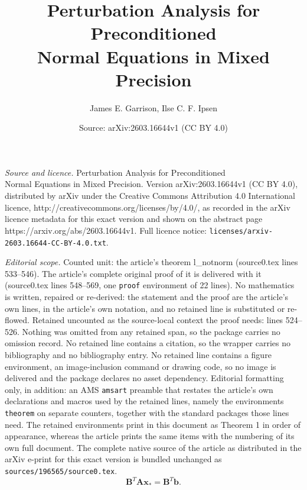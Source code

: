 \documentclass[10pt,a4paper]{amsart}
\title{Perturbation Analysis for Preconditioned\\ Normal Equations in Mixed Precision}
\author{James E. Garrison, Ilse C. F. Ipsen}
\date{Source: arXiv:2603.16644v1 (CC BY 4.0)}
\newcommand{\ma}{\boldsymbol{A}}
\newcommand{\mb}{\boldsymbol{B}}
\newcommand{\vb}{\boldsymbol{b}}
\newcommand{\vx}{\boldsymbol{x}}
\begin{document}
\maketitle

\noindent\emph{Source and licence.} Perturbation Analysis for Preconditioned\\ Normal Equations in Mixed Precision. Version arXiv:2603.16644v1 (CC BY 4.0), distributed by arXiv under the Creative Commons Attribution 4.0 International licence, http://creativecommons.org/licenses/by/4.0/, as recorded in the arXiv licence metadata for this exact version and shown on the abstract page https://arxiv.org/abs/2603.16644v1. Full licence notice: \texttt{licenses/arxiv-2603.16644-CC-BY-4.0.txt}.\par\smallskip

\noindent\textit{Editorial scope.} Counted unit: the article's theorem l\_notnorm (source0.tex lines 533--546). The article's complete original proof of it is delivered with it (source0.tex lines 548--569, one \texttt{proof} environment of 22 lines). No mathematics is written, repaired or re-derived: the statement and the proof are the article's own lines, in the article's own notation, and no retained line is substituted or re-flowed.  Retained uncounted as the source-local context the proof needs: lines 524--526.  Nothing was omitted from any retained span, so the package carries no omission record.  No retained line contains a citation, so the wrapper carries no bibliography and no bibliography entry.  No retained line contains a figure environment, an image-inclusion command or drawing code, so no image is delivered and the package declares no asset dependency.  Editorial formatting only, in addition: an AMS \texttt{amsart} preamble that restates the article's own declarations and macros used by the retained lines, namely the environments \texttt{theorem} on separate counters, together with the standard packages those lines need.  The retained environments print in this document as Theorem 1 in order of appearance, whereas the article prints the same items with the numbering of its own full document.  The complete native source of the article as distributed in the arXiv e-print for this exact version is bundled unchanged as \texttt{sources/196565/source0.tex}.
\begin{equation}\label{e_nne}
    \mb^T\ma\vx_*=\mb^T\vb.
\end{equation}
\end{document}
